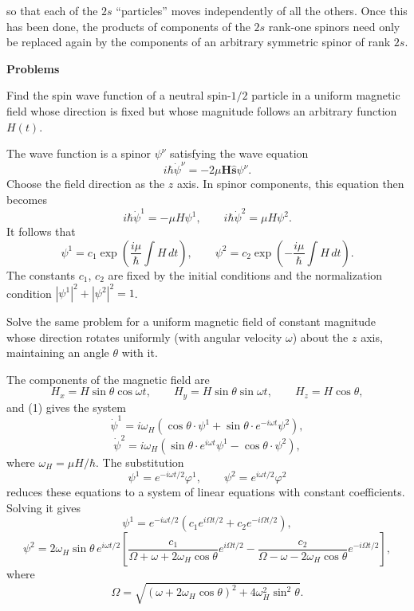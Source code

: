 so that each of the $2s$ ``particles'' moves independently of all the others.
Once this has been done, the products of components of the $2s$ rank-one
spinors need only be replaced again by the components of an arbitrary
symmetric spinor of rank $2s$.

\begin{center}\textbf{Problems}\end{center}

 Find the spin wave function of a neutral spin-$1/2$
particle in a uniform magnetic field whose direction is fixed but whose
magnitude follows an arbitrary function $H(t)$.

\SolutionHeading The wave function is a spinor $\psi^\nu$ satisfying the wave
equation
\begin{equation}
 i\hbar\dot\psi^\nu=-2\mu\mathbf H\hat{\mathbf s}\psi^\nu.
 \tag{1}
\end{equation}
Choose the field direction as the $z$ axis. In spinor components, this equation
then becomes
\[
 i\hbar\dot\psi^1=-\mu H\psi^1,\qquad
 i\hbar\dot\psi^2=\mu H\psi^2.
\]
It follows that
\[
 \psi^1=c_1\exp\left(\frac{i\mu}{\hbar}\int H\,dt\right),
 \qquad
 \psi^2=c_2\exp\left(-\frac{i\mu}{\hbar}\int H\,dt\right).
\]
The constants $c_1$, $c_2$ are fixed by the initial conditions and the
normalization condition $|\psi^1|^2+|\psi^2|^2=1$.

 Solve the same problem for a uniform magnetic field of
constant magnitude whose direction rotates uniformly (with angular velocity
$\omega$) about the $z$ axis, maintaining an angle $\theta$ with it.

\SolutionHeading The components of the magnetic field are
\[
 H_x=H\sin\theta\cos\omega t,\qquad
 H_y=H\sin\theta\sin\omega t,\qquad
 H_z=H\cos\theta,
\]
and (1) gives the system
\[
 \dot\psi^1=i\omega_H(\cos\theta\cdot\psi^1
  +\sin\theta\cdot e^{-i\omega t}\psi^2),
\]
\[
 \dot\psi^2=i\omega_H(\sin\theta\cdot e^{i\omega t}\psi^1
  -\cos\theta\cdot\psi^2),
\]
where $\omega_H=\mu H/\hbar$. The substitution
\[
 \psi^1=e^{-i\omega t/2}\varphi^1,\qquad
 \psi^2=e^{i\omega t/2}\varphi^2
\]
reduces these equations to a system of linear equations with constant
coefficients. Solving it gives
\[
 \psi^1=e^{-i\omega t/2}
   \left(c_1e^{i\Omega t/2}+c_2e^{-i\Omega t/2}\right),
\]
\[
 \psi^2=2\omega_H\sin\theta\,e^{i\omega t/2}
 \left[
  \frac{c_1}{\Omega+\omega+2\omega_H\cos\theta}e^{i\Omega t/2}
  -\frac{c_2}{\Omega-\omega-2\omega_H\cos\theta}e^{-i\Omega t/2}
 \right],
\]
where
\[
 \Omega=\sqrt{(\omega+2\omega_H\cos\theta)^2
              +4\omega_H^2\sin^2\theta}.
\]

